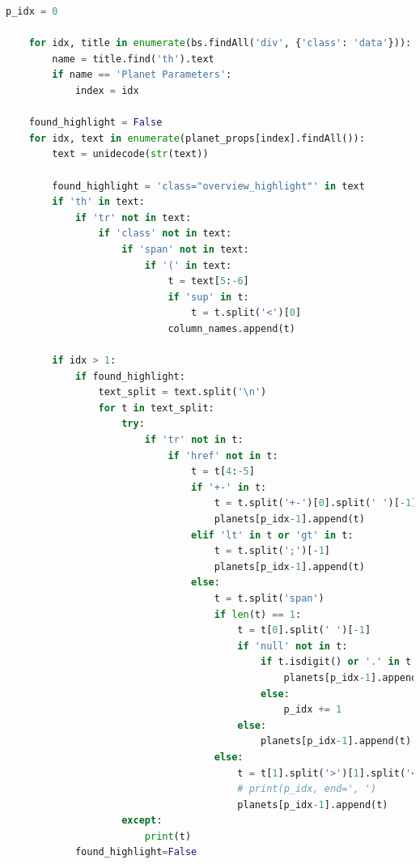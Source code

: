 \documentclass[11pt, oneside]{article}   	%
\begin{document}
\begin{lstlisting}[language=Python, caption={Extracting data from \href{https://exoplanetarchive.ipac.caltech.edu/}{Nasa Exoplanet Archive}}]
    p_idx = 0

    for idx, title in enumerate(bs.findAll('div', {'class': 'data'})):
        name = title.find('th').text
        if name == 'Planet Parameters':
            index = idx

    found_highlight = False
    for idx, text in enumerate(planet_props[index].findAll()):
        text = unidecode(str(text))

        found_highlight = 'class="overview_highlight"' in text
        if 'th' in text:
            if 'tr' not in text:
                if 'class' not in text:
                    if 'span' not in text:
                        if '(' in text:
                            t = text[5:-6]
                            if 'sup' in t:
                                t = t.split('<')[0]
                            column_names.append(t)
                            
        if idx > 1:
            if found_highlight:
                text_split = text.split('\n')
                for t in text_split:
                    try:
                        if 'tr' not in t:
                            if 'href' not in t:
                                t = t[4:-5]
                                if '+-' in t:
                                    t = t.split('+-')[0].split(' ')[-1]
                                    planets[p_idx-1].append(t)
                                elif 'lt' in t or 'gt' in t:
                                    t = t.split(';')[-1]
                                    planets[p_idx-1].append(t)
                                else:
                                    t = t.split('span')
                                    if len(t) == 1:
                                        t = t[0].split(' ')[-1]
                                        if 'null' not in t:
                                            if t.isdigit() or '.' in t:
                                                planets[p_idx-1].append(t)
                                            else:
                                                p_idx += 1
                                        else:
                                            planets[p_idx-1].append(t)
                                    else:
                                        t = t[1].split('>')[1].split('<')[0]
                                        # print(p_idx, end=', ')
                                        planets[p_idx-1].append(t)
                    except:
                        print(t)
            found_highlight=False


\end{lstlisting}
\end{document}
